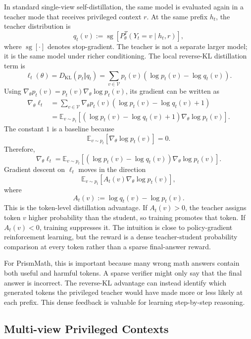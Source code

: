In standard single-view self-distillation, the same model is evaluated again in a teacher mode that receives privileged context $r$. At the same prefix $h_t$, the teacher distribution is
\[
    q_t(v) := \operatorname{sg}\left[P_{\theta}^{T}(Y_t=v \mid h_t,r)\right],
\]
where $\operatorname{sg}[\cdot]$ denotes stop-gradient. The teacher is not a separate larger model; it is the same model under richer conditioning. The local reverse-KL distillation term is
\[
    \ell_t(\theta)=D_{\mathrm{KL}}(p_t \Vert q_t)
    = \sum_{v\in\mathcal{V}} p_t(v)\left(\log p_t(v)-\log q_t(v)\right).
\]
Using $\nabla_\theta p_t(v)=p_t(v)\nabla_\theta\log p_t(v)$, its gradient can be written as
\[
\begin{aligned}
    \nabla_\theta \ell_t
    &= \sum_{v\in\mathcal{V}} \nabla_\theta p_t(v)
       \left(\log p_t(v)-\log q_t(v)+1\right)\\
    &= \mathbb{E}_{v\sim p_t}
       \left[\left(\log p_t(v)-\log q_t(v)+1\right)
       \nabla_\theta\log p_t(v)\right].
\end{aligned}
\]
The constant $1$ is a baseline because
\[
    \mathbb{E}_{v\sim p_t}[\nabla_\theta\log p_t(v)] = 0.
\]
Therefore,
\[
    \nabla_\theta \ell_t
    = \mathbb{E}_{v\sim p_t}
       \left[\left(\log p_t(v)-\log q_t(v)\right)
       \nabla_\theta\log p_t(v)\right].
\]
Gradient descent on $\ell_t$ moves in the direction
\[
    \mathbb{E}_{v\sim p_t}\left[A_t(v)\nabla_\theta\log p_t(v)\right],
\]
where
\[
    A_t(v) := \log q_t(v)-\log p_t(v).
    \label{eq:single-advantage}
\]
This is the token-level distillation advantage. If $A_t(v)>0$, the teacher assigns token $v$ higher probability than the student, so training promotes that token. If $A_t(v)<0$, training suppresses it. The intuition is close to policy-gradient reinforcement learning, but the reward is a dense teacher-student probability comparison at every token rather than a sparse final-answer reward.

For PrismMath, this is important because many wrong math answers contain both useful and harmful tokens. A sparse verifier might only say that the final answer is incorrect. The reverse-KL advantage can instead identify which generated tokens the privileged teacher would have made more or less likely at each prefix. This dense feedback is valuable for learning step-by-step reasoning.

\subsection{Multi-view Privileged Contexts}

